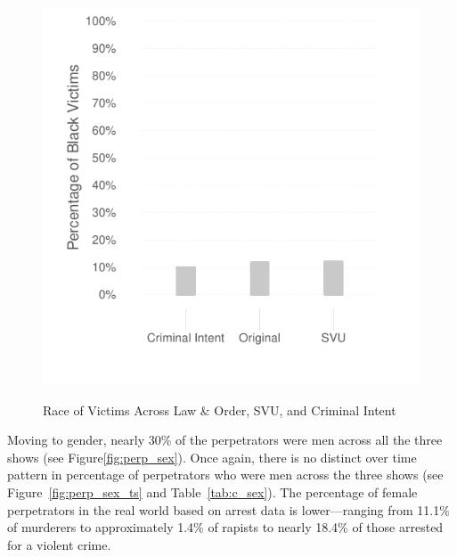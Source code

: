 \documentclass[12pt, letterpaper]{article}
\begin{document}
\begin{figure}[htbp]
\centering
\caption{Race of Victims Across Law \& Order, SVU, and Criminal Intent}
\includegraphics[scale=1]{../figs/all_victims_by_race.pdf}
\label{fig:victim_race}
\end{figure}

Moving to gender, nearly 30\% of the perpetrators were men across all the three shows (see Figure\ref{fig:perp_sex}). Once again, there is no distinct over time pattern in percentage of perpetrators who were men across the three shows (see Figure~\ref{fig:perp_sex_ts} and Table~\ref{tab:c_sex}). The percentage of female perpetrators in the real world based on arrest data is lower---ranging from 11.1\% of murderers to approximately 1.4\% of rapists to nearly 18.4\% of those arrested for a violent crime. 
\end{document}
